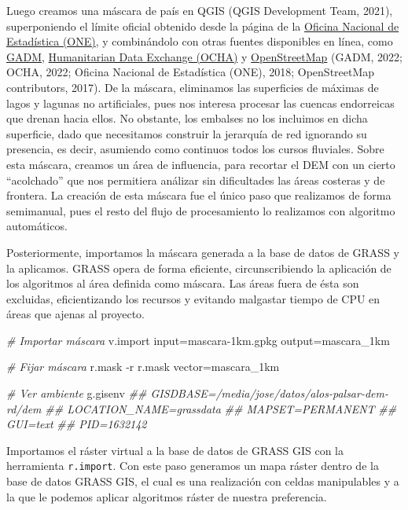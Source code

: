 \documentclass[spanish]{article}
\newenvironment{Shaded}{\begin{snugshade}}{\end{snugshade}}
\newcommand{\AttributeTok}[1]{\textcolor[rgb]{0.77,0.63,0.00}{#1}}
\newcommand{\CommentTok}[1]{\textcolor[rgb]{0.56,0.35,0.01}{\textit{#1}}}
\newcommand{\ExtensionTok}[1]{#1}
\newcommand{\NormalTok}[1]{#1}
\begin{document}
Luego creamos una máscara de país en QGIS (QGIS Development Team, 2021),
superponiendo el límite oficial obtenido desde la página de la
\href{https://www.one.gob.do/}{Oficina Nacional de Estadística (ONE)}, y
combinándolo con otras fuentes disponibles en línea, como
\href{https://gadm.org/}{GADM},
\href{https://data.humdata.org/dataset/cod-ab-dom}{Humanitarian Data
Exchange (OCHA)} y \href{https://www.openstreetmap.org}{OpenStreetMap}
(GADM, 2022; OCHA, 2022; Oficina Nacional de Estadística (ONE), 2018;
OpenStreetMap contributors, 2017). De la máscara, eliminamos las
superficies de máximas de lagos y lagunas no artificiales, pues nos
interesa procesar las cuencas endorreicas que drenan hacia ellos. No
obstante, los embalses no los incluimos en dicha superficie, dado que
necesitamos construir la jerarquía de red ignorando su presencia, es
decir, asumiendo como continuos todos los cursos fluviales. Sobre esta
máscara, creamos un área de influencia, para recortar el DEM con un
cierto ``acolchado'' que nos permitiera análizar sin dificultades las
áreas costeras y de frontera. La creación de esta máscara fue el único
paso que realizamos de forma semimanual, pues el resto del flujo de
procesamiento lo realizamos con algoritmo automáticos.

Posteriormente, importamos la máscara generada a la base de datos de
GRASS y la aplicamos. GRASS opera de forma eficiente, circunscribiendo
la aplicación de los algoritmos al área definida como máscara. Las áreas
fuera de ésta son excluidas, eficientizando los recursos y evitando
malgastar tiempo de CPU en áreas que ajenas al proyecto.

\begin{Shaded}
\begin{Highlighting}[]
\CommentTok{\# Importar máscara}
\ExtensionTok{v.import}\NormalTok{ input=mascara{-}1km.gpkg output=mascara\_1km}

\CommentTok{\# Fijar máscara}
\ExtensionTok{r.mask} \AttributeTok{{-}r}
\ExtensionTok{r.mask}\NormalTok{ vector=mascara\_1km}

\CommentTok{\# Ver ambiente}
\ExtensionTok{g.gisenv}
\CommentTok{\#\# GISDBASE=/media/jose/datos/alos{-}palsar{-}dem{-}rd/dem}
\CommentTok{\#\# LOCATION\_NAME=grassdata}
\CommentTok{\#\# MAPSET=PERMANENT}
\CommentTok{\#\# GUI=text}
\CommentTok{\#\# PID=1632142}
\end{Highlighting}
\end{Shaded}

Importamos el ráster virtual a la base de datos de GRASS GIS con la
herramienta \texttt{r.import}. Con este paso generamos un mapa ráster
dentro de la base de datos GRASS GIS, el cual es una realización con
celdas manipulables y a la que le podemos aplicar algoritmos ráster de
nuestra preferencia.
\end{document}
